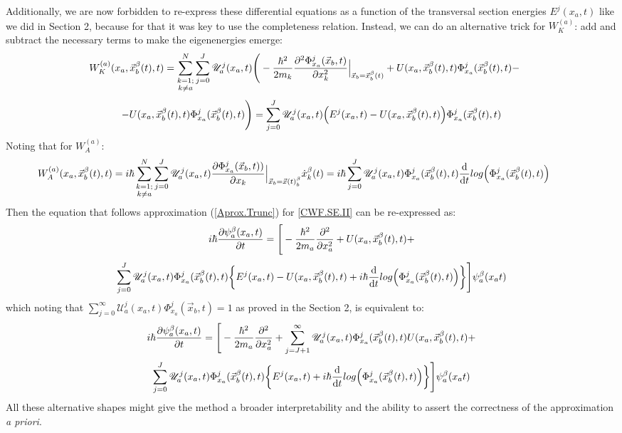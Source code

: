\documentclass[11pt, a4paper]{article} %
\newcommand{\U}{\mathscr{U}}
\begin{document}
Additionally, we are now forbidden to re-express these differential equations as a function of the transversal section energies $E^j(x_a,t)$ like we did in Section 2, because for that it was key to use the completeness relation. Instead, we can do an alternative trick for $W^{(a)}_K$: add and subtract the necessary terms to make the eigenenergies emerge:
$$
\hspace{-0.5cm} W_K^{(a)}(x_a, \vec{x}_b^\beta (t),t)= \sum_{\substack{k=1; \\ k\neq a}}^{N} \sum_{j=0}^J \U^j_a(x_a,t) \Bigg( -\frac{\hbar^2}{2m_k} \pdv[2]{ \Phi_{x_a}^j(\vec{x}_b,t)}{x_k}\Big\rvert_{\vec{x}_b=\vec{x}_b^\beta(t)} +U(x_a, \vec{x}_b^\beta(t), t)\Phi_{x_a}^j(\vec{x}_b^\beta(t),t) -
$$
$$
- U(x_a, \vec{x}_b^\beta(t), t)\Phi_{x_a}^j(\vec{x}_b^\beta(t),t)\Bigg)=\sum_{j=0}^J \U^j_a(x_a,t)\qty( E^j(x_a,t)-U(x_a, \vec{x}_b^\beta(t), t)) \Phi^j_{x_a}(\vec{x}_b^\beta(t),t)
$$
Noting that for $W^{(a)}_A$:
$$
\hspace{-1.25cm}W_A^{(a)}(x_a, \vec{x}_b^\beta (t),t)=i\hbar\sum_{\substack{k=1; \\ k\neq a}}^{N} \sum_{j=0}^J \U^j_a(x_a,t) \pdv{ \Phi_{x_a}^j(\vec{x}_b,t))}{x_k}\Big\rvert_{\vec{x}_b=\vec{x}(t)_b^\beta} \dot{x}_k^\beta(t)=i\hbar\sum_{j=0}^J\U^j_a(x_a,t)\Phi_{x_a}^j(\vec{x}_b^\beta(t),t)\dv{}{t}log\qty(\Phi_{x_a}^j(\vec{x}_b^\beta(t),t))
$$
Then the equation that follows approximation (\ref{Aprox.Trunc}) for \ref{CWF.SE.II} can be re-expressed as:
$$
i\hbar \pdv{\psi_a^\beta(x_a, t)}{t} = \Bigg[- \frac{\hbar^2}{2m_a}\pdv[2]{}{x_a} + U(x_a, \vec{x}_b^\beta(t), t)+ 
$$
$$
\sum_{j=0}^J \U^j_a(x_a,t)\Phi^j_{x_a}(\vec{x}_b^\beta(t),t)\qty{ E^j(x_a,t)-U(x_a, \vec{x}_b^\beta(t), t) +i\hbar\dv{}{t}log\qty(\Phi_{x_a}^j(\vec{x}_b^\beta(t),t))}  \Bigg]\psi_a^\beta(x_a t)
$$
which noting that $\sum_{j=0}^\infty \U^j_a(x_a,t)\Phi^j_{x_a}(\vec{x}_b,t)=1$ as proved in the Section 2, is equivalent to:
$$
i\hbar \pdv{\psi_a^\beta(x_a, t)}{t} = \Bigg[- \frac{\hbar^2}{2m_a}\pdv[2]{}{x_a} + \sum_{j=J+1}^\infty \U^j_a(x_a,t)\Phi^j_{x_a}(\vec{x}_b^\beta(t),t)U(x_a, \vec{x}_b^\beta(t), t)+ 
$$
$$
\sum_{j=0}^J \U^j_a(x_a,t)\Phi^j_{x_a}(\vec{x}_b^\beta(t),t)\qty{ E^j(x_a,t)+i\hbar\dv{}{t}log\qty(\Phi_{x_a}^j(\vec{x}_b^\beta(t),t))}  \Bigg]\psi_a^\beta(x_a t)
$$
All these alternative shapes might give the method a broader interpretability and the ability to assert the correctness of the approximation {\em a priori}.
\newpage
\end{document}
